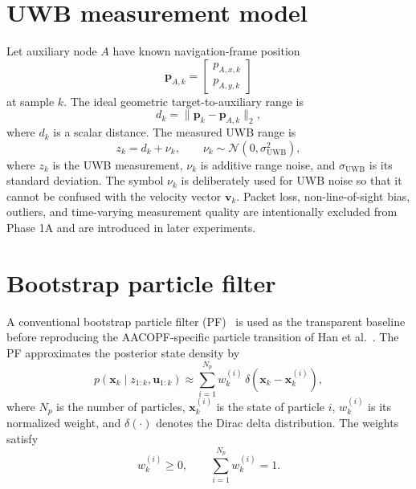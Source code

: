 \section{UWB measurement model}
Let auxiliary node $A$ have known navigation-frame position
\begin{equation}
\bm{p}_{A,k}=
\begin{bmatrix}p_{A,x,k}\\p_{A,y,k}\end{bmatrix}
\end{equation}
at sample $k$. The ideal geometric target-to-auxiliary range is
\begin{equation}
d_k=\lVert\bm{p}_k-\bm{p}_{A,k}\rVert_2,
\end{equation}
where $d_k$ is a scalar distance. The measured UWB range is
\begin{equation}
z_k=d_k+\nu_k,
\qquad
\nu_k\sim\mathcal{N}(0,\sigma_{\mathrm{UWB}}^2),
\label{eq:uwb_measurement}
\end{equation}
where $z_k$ is the UWB measurement, $\nu_k$ is additive range noise, and $\sigma_{\mathrm{UWB}}$ is its standard deviation. The symbol $\nu_k$ is deliberately used for UWB noise so that it cannot be confused with the velocity vector $\bm{v}_k$. Packet loss, non-line-of-sight bias, outliers, and time-varying measurement quality are intentionally excluded from Phase 1A and are introduced in later experiments.

\section{Bootstrap particle filter}
A conventional bootstrap particle filter (PF)~\cite{arulampalam2002tutorial,ristic2004beyond} is used as the transparent baseline before reproducing the AACOPF-specific particle transition of Han et al.~\cite{han2020cooperative}. The PF approximates the posterior state density by
\begin{equation}
p(\bm{x}_k\mid z_{1:k},\bm{u}_{1:k})\approx
\sum_{i=1}^{N_p}w_k^{(i)}\,\delta\!\left(\bm{x}_k-\bm{x}_k^{(i)}\right),
\end{equation}
where $N_p$ is the number of particles, $\bm{x}_k^{(i)}$ is the state of particle $i$, $w_k^{(i)}$ is its normalized weight, and $\delta(\cdot)$ denotes the Dirac delta distribution. The weights satisfy
\begin{equation}
w_k^{(i)}\ge 0,
\qquad
\sum_{i=1}^{N_p}w_k^{(i)}=1.
\end{equation}


